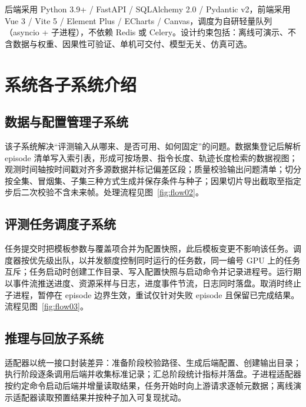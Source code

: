 后端采用 Python 3.9+ / FastAPI / SQLAlchemy 2.0 / Pydantic v2，前端采用 Vue 3 / Vite 5 / Element Plus / ECharts / Canvas，调度为自研轻量队列（asyncio + 子进程），不依赖 Redis 或 Celery。设计约束包括：离线可演示、不含数据与权重、因果性可验证、单机可交付、模型无关、仿真可选。

\chapter{系统各子系统介绍}

\section{数据与配置管理子系统}

该子系统解决“评测输入从哪来、是否可用、如何固定”的问题。数据集登记后解析 episode 清单写入索引表，形成可按场景、指令长度、轨迹长度检索的数据视图；观测时间轴按时间戳对齐多源数据并标记偏差区段；质量校验输出问题清单；切分按全集、冒烟集、子集三种方式生成并保存条件与种子；因果切片导出截取至指定步后二次校验不含未来帧。处理流程见图~\ref{fig:flow02}。


\section{评测任务调度子系统}

任务提交时把模板参数与覆盖项合并为配置快照，此后模板变更不影响该任务。调度器按优先级出队，以并发额度控制同时运行的任务数，同一编号 GPU 上的任务互斥；任务启动时创建工作目录、写入配置快照与启动命令并记录进程号。运行期以事件流推送进度、资源采样与日志，进度事件节流，日志同时落盘。取消时终止子进程，暂停在 episode 边界生效，重试仅针对失败 episode 且保留已完成结果。流程见图~\ref{fig:flow03}。


\section{推理与回放子系统}

适配器以统一接口封装差异：准备阶段校验路径、生成后端配置、创建输出目录；执行阶段逐条调用后端并收集标准记录；汇总阶段统计指标并落盘。子进程适配器按约定命令启动后端并增量读取结果，任务开始时向上游请求逐帧元数据；离线演示适配器读取预置结果并按种子加入可复现扰动。

